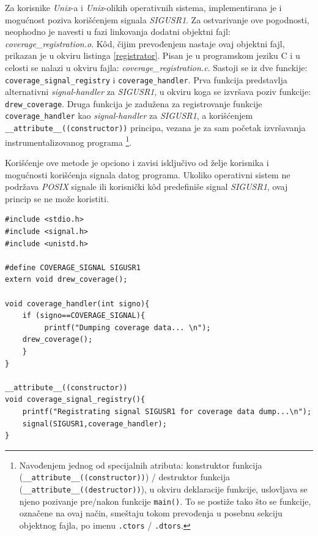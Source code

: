 \documentclass[12pt,oneside]{memoir}
\newcommand{\kod}[1]{\texttt{#1}}
\newcommand{\strano}[1]{\textit{#1}}
\begin{document}
Za korisnike \strano{Unix}-a i \strano{Unix}-olikih operativnih sistema, implementirana je i mogućnost poziva korišćenjem signala \strano{SIGUSR1}. Za ostvarivanje ove pogodnosti, neophodno je navesti u fazi linkovanja dodatni objektni fajl: \strano{coverage\_registration.o}. K\^{o}d, čijim prevođenjem nastaje ovaj objektni fajl, prikazan je u okviru listinga \ref{registrator}. Pisan je u programskom jeziku C i u celosti se nalazi u okviru fajla:  \strano{coverage\_registration.c}. Sastoji se iz dve funckije: \kod{coverage\_signal\_registry} i \kod{coverage\_handler}. Prva funkcija predstavlja alternativni \strano{signal-handler} za \strano{SIGUSR1}, u okviru koga se izvršava poziv funkcije: \kod{drew\_coverage}. Druga funkcija je zadužena za registrovanje funkcije \kod{coverage\_handler} kao \strano{signal-handler} za \strano{SIGUSR1}, a korišćenjem \kod{\_\_attribute\_\_((constructor))} principa, vezana je za sam početak izvršavanja instrumentalizovanog programa \footnote{Navođenjem jednog od specijalnih atributa: konstruktor funkcija (\kod{\_\_attribute\_\_((constructor))}) / destruktor funkcija (\kod{\_\_attribute\_\_((destructor))}), u okviru deklaracije funkcije, uslovljava se njeno pozivanje pre/nakon funkcije \kod{main()}. To se postiže tako što se funkcije, označene na ovaj način, smeštaju tokom prevođenja u posebnu sekciju objektnog fajla, po imenu \kod{.ctors} / \kod{.dtors}.}. 

Korišćenje ove metode je opciono i zavisi isključivo od želje korisnika i mogućnosti korišćenja signala datog programa. Ukoliko operativni sistem ne podržava \strano{POSIX} signale ili korisnički k\^{o}d predefiniše signal \strano{SIGUSR1}, ovaj princip se ne može koristiti.

\newpage

\begin{lstlisting}[caption={Izvorni k\^{o}d u okviru fajla: \strano{coverage\_registration.c}},frame=single, label=registrator]
#include <stdio.h>                                                       
#include <signal.h>                                                      
#include <unistd.h>     

#define COVERAGE_SIGNAL SIGUSR1
extern void drew_coverage();

void coverage_handler(int signo){
    if (signo==COVERAGE_SIGNAL){
         printf("Dumping coverage data... \n");
    drew_coverage();
    }
}

__attribute__((constructor))
void coverage_signal_registry(){
    printf("Registrating signal SIGUSR1 for coverage data dump...\n");
    signal(SIGUSR1,coverage_handler);
}
\end{lstlisting}
\end{document}
